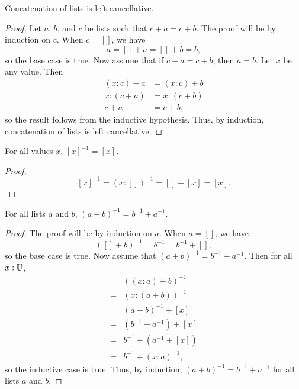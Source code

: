 \documentclass[../math.tex]{subfiles}
\begin{document}
\begin{instance}
    Concatenation of lists is left cancellative.
\end{instance}
\begin{proof}
    Let $a$, $b$, and $c$ be lists such that $c + a = c + b$.  The proof will be
    by induction on $c$.  When $c = []$, we have
    \[
        a = [] + a = [] + b = b,
    \]
    so the base case is true.  Now assume that if $c + a = c + b$, then $a = b$.
    Let $x$ be any value.  Then
    \begin{align*}
        (x : c) + a &= (x : c) + b \\
        x : (c + a) &= x : (c + b) \\
        c + a &= c + b,
    \end{align*}
    so the result follows from the inductive hypothesis.  Thus, by induction,
    concatenation of lists is left cancellative.
\end{proof}

\begin{theorem}
    For all values $x$, $[x]^{-1} = [x]$.
\end{theorem}
\begin{proof}
    \[
        [x]^{-1} = (x : [])^{-1} = [] + [x] = [x].
    \]
\end{proof}

\begin{theorem}
    For all lists $a$ and $b$, $(a + b)^{-1} = b^{-1} + a^{-1}$.
\end{theorem}
\begin{proof}
    The proof will be by induction on $a$.  When $a = []$, we have
    \[
        ([] + b)^{-1} = b^{-1} = b^{-1} + [],
    \]
    so the base case is true.  Now assume that $(a + b)^{-1} = b^{-1} +
    a^{-1}$.  Then for all $x : \mathbb{U}$,
    \begin{align*}
           & ((x : a) + b)^{-1} \\
        ={}& (x : (a + b))^{-1} \\
        ={}& (a + b)^{-1} + [x] \\
        ={}& (b^{-1} + a^{-1}) + [x] \\
        ={}& b^{-1} + (a^{-1} + [x]) \\
        ={}& b^{-1} + (x : a)^{-1},
    \end{align*}
    so the inductive case is true.  Thus, by induction, $(a + b)^{-1} =
    b^{-1} + a^{-1}$ for all lists $a$ and $b$.
\end{proof}
\end{document}

